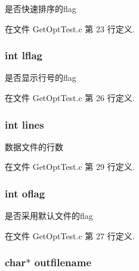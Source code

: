 是否快速排序的flag 



在文件 Get\-Opt\-Test.\-c 第 23 行定义.

\hypertarget{structglobal_args__t_a4cc7e6867b564ffab9f569351d574a67}{
\subsubsection[{lflag}]{\setlength{\rightskip}{0pt plus 5cm}int lflag}}\label{structglobal_args__t_a4cc7e6867b564ffab9f569351d574a67}


是否显示行号的flag 



在文件 Get\-Opt\-Test.\-c 第 26 行定义.

\hypertarget{structglobal_args__t_a9921ae02cadccc99dd6c3a9b68be050a}{
\subsubsection[{lines}]{\setlength{\rightskip}{0pt plus 5cm}int lines}}\label{structglobal_args__t_a9921ae02cadccc99dd6c3a9b68be050a}


数据文件的行数 



在文件 Get\-Opt\-Test.\-c 第 29 行定义.

\hypertarget{structglobal_args__t_ae48c37db113eec555c7f4ce2e48e90de}{
\subsubsection[{oflag}]{\setlength{\rightskip}{0pt plus 5cm}int oflag}}\label{structglobal_args__t_ae48c37db113eec555c7f4ce2e48e90de}


是否采用默认文件的flag 



在文件 Get\-Opt\-Test.\-c 第 27 行定义.

\hypertarget{structglobal_args__t_aa40c5c56cd04686687e0cd71d52ea78b}{
\subsubsection[{outfilename}]{\setlength{\rightskip}{0pt plus 5cm}char$\ast$ outfilename}}\label{structglobal_args__t_aa40c5c56cd04686687e0cd71d52ea78b}


